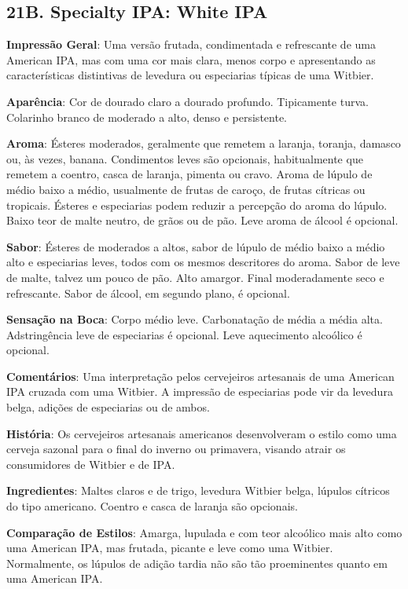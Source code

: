 \subsection*{21B. Specialty IPA: White IPA}
\textbf{Impressão Geral}: Uma versão frutada, condimentada e refrescante de uma American IPA, mas com uma cor mais clara, menos corpo e apresentando as características distintivas de levedura ou especiarias típicas de uma Witbier.

\textbf{Aparência}: Cor de dourado claro a dourado profundo. Tipicamente turva. Colarinho branco de moderado a alto, denso e persistente.

\textbf{Aroma}: Ésteres moderados, geralmente que remetem a laranja, toranja, damasco ou, às vezes, banana. Condimentos leves são opcionais, habitualmente que remetem a coentro, casca de laranja, pimenta ou cravo. Aroma de lúpulo de médio baixo a médio, usualmente de frutas de caroço, de frutas cítricas ou tropicais. Ésteres e especiarias podem reduzir a percepção do aroma do lúpulo. Baixo teor de malte neutro, de grãos ou de pão. Leve aroma de álcool é opcional.

\textbf{Sabor}: Ésteres de moderados a altos, sabor de lúpulo de médio baixo a médio alto e especiarias leves, todos com os mesmos descritores do aroma. Sabor de leve de malte, talvez um pouco de pão. Alto amargor. Final moderadamente seco e refrescante. Sabor de álcool, em segundo plano, é opcional.

\textbf{Sensação na Boca}: Corpo médio leve. Carbonatação de média a média alta. Adstringência leve de especiarias é opcional. Leve aquecimento alcoólico é opcional.

\textbf{Comentários}: Uma interpretação pelos cervejeiros artesanais de uma American IPA cruzada com uma Witbier. A impressão de especiarias pode vir da levedura belga, adições de especiarias ou de ambos.

\textbf{História}: Os cervejeiros artesanais americanos desenvolveram o estilo como uma cerveja sazonal para o final do inverno ou primavera, visando atrair os consumidores de Witbier e de IPA.

\textbf{Ingredientes}: Maltes claros e de trigo, levedura Witbier belga, lúpulos cítricos do tipo americano. Coentro e casca de laranja são opcionais.

\textbf{Comparação de Estilos}: Amarga, lupulada e com teor alcoólico mais alto como uma American IPA, mas frutada, picante e leve como uma Witbier. Normalmente, os lúpulos de adição tardia não são tão proeminentes quanto em uma American IPA.

